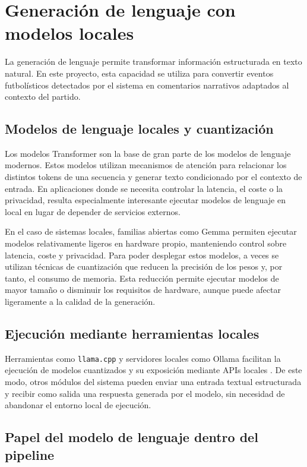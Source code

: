 \section{Generación de lenguaje con modelos locales}

La generación de lenguaje permite transformar información estructurada en texto natural. En este proyecto, esta capacidad se utiliza para convertir eventos futbolísticos detectados por el sistema en comentarios narrativos adaptados al contexto del partido.


\subsection{Modelos de lenguaje locales y cuantización}

Los modelos Transformer \citep{vaswani2017attention} son la base de gran parte de los modelos de lenguaje modernos. Estos modelos utilizan mecanismos de atención para relacionar los distintos tokens de una secuencia y generar texto condicionado por el contexto de entrada. En aplicaciones donde se necesita controlar la latencia, el coste o la privacidad, resulta especialmente interesante ejecutar modelos de lenguaje en local en lugar de depender de servicios externos.

En el caso de sistemas locales, familias abiertas como Gemma \citep{gemma2024} permiten ejecutar modelos relativamente ligeros en hardware propio, manteniendo control sobre latencia, coste y privacidad. Para poder desplegar estos modelos, a veces se utilizan técnicas de cuantización que reducen la precisión de los pesos y, por tanto, el consumo de memoria. Esta reducción permite ejecutar modelos de mayor tamaño o disminuir los requisitos de hardware, aunque puede afectar ligeramente a la calidad de la generación.

\subsection{Ejecución mediante herramientas locales}
Herramientas como \texttt{llama.cpp} y servidores locales como Ollama facilitan la ejecución de modelos cuantizados y su exposición mediante APIs locales \citep{llamacpp,ollamaDocs}. De este modo, otros módulos del sistema pueden enviar una entrada textual estructurada y recibir como salida una respuesta generada por el modelo, sin necesidad de abandonar el entorno local de ejecución.


\subsection{Papel del modelo de lenguaje dentro del pipeline}

